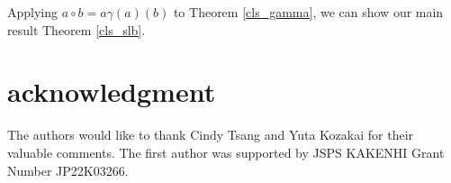 \documentclass[12pt]{amsart}
\theoremstyle{definition}
\newcommand{\ci}{\circ}
\begin{document}
Applying $a\ci b=a\gamma(a)(b)$ to Theorem \ref{cls_gamma}, we can show
our main result Theorem \ref{cls_slb}.

\section*{acknowledgment}
The authors would like to thank Cindy Tsang
and Yuta Kozakai for their valuable comments.
The first author was supported by JSPS KAKENHI Grant Number JP22K03266.


\providecommand{\bysame}{\leavevmode\hbox to3em{\hrulefill}\thinspace}
\providecommand{\MR}{\relax\ifhmode\unskip\space\fi MR }
\providecommand{\MRhref}[2]{%
  \href{http://www.ams.org/mathscinet-getitem?mr=#1}{#2}
}
\providecommand{\href}[2]{#2}
\end{document}
